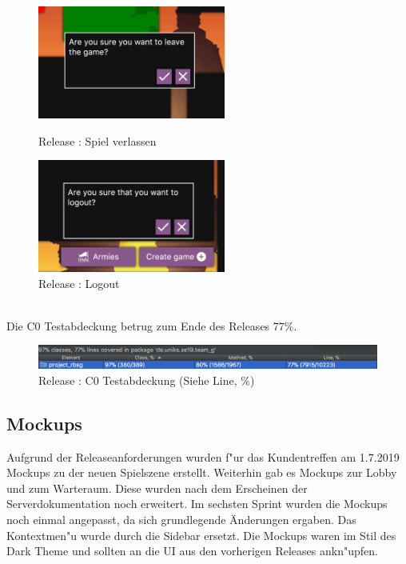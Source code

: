 \documentclass[12pt, titlepage]{scrartcl}
\newcommand{\RN}[1]{%
	\textup{\uppercase\expandafter{\romannumeral#1}}%
}
\begin{document}
		        \begin{figure}[H]
                    \centering
                    \begin{minipage}{0.55\textwidth}
                        \centering
                        \includegraphics[width=0.55\textwidth]{images/old_state/additional/LeaveGame.png}
                        \caption{Release \RN{2}: Spiel verlassen}
                        \label{Leave_Game}
                    \end{minipage}%
                    \begin{minipage}{0.55\textwidth}
                        \centering
                        \includegraphics[width=0.55\textwidth]{images/old_state/additional/Logout.png}
                        \caption{Release \RN{2}: Logout}
                        \label{Logout}
                    \end{minipage}
                \end{figure}
                \ \\ Die C0 Testabdeckung betrug zum Ende des Releases \RN{2} 77\%.
                \begin{figure}[H] 
    				\centering
    				\includegraphics[width=\textwidth]{images/old_state/Coverage.png}
    				\caption{Release \RN{2}: C0 Testabdeckung (Siehe Line, \%)}
    				\label{Coverage}
			    \end{figure}
    \newpage
	    \subsection{Mockups}
	        Aufgrund der Releaseanforderungen wurden f"ur das Kundentreffen am 1.7.2019 Mockups zu der neuen Spielszene erstellt. Weiterhin gab es Mockups zur Lobby und zum Warteraum. Diese wurden nach dem Erscheinen der Serverdokumentation noch erweitert. Im sechsten Sprint wurden die Mockups noch einmal angepasst, da sich grundlegende \"Anderungen ergaben. Das Kontextmen"u wurde durch die Sidebar ersetzt. Die Mockups waren im Stil des Dark Theme und sollten an die UI aus den vorherigen Releases ankn"upfen.
\end{document}
